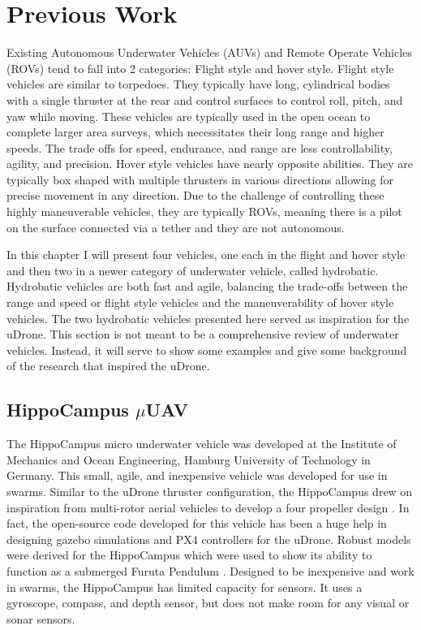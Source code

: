 \section{Previous Work}
Existing Autonomous Underwater Vehicles (AUVs) and Remote Operate Vehicles (ROVs) tend to fall into 2 categories: Flight style and hover style. Flight style vehicles are similar to torpedoes. They typically have long, cylindrical bodies with a single thruster at the rear and control surfaces to control roll, pitch, and yaw while moving. These vehicles are typically used in the open ocean to complete larger area surveys, which necessitates their long range and higher speeds. The trade offs for speed, endurance, and range are less controllability, agility, and precision. Hover style vehicles have nearly opposite abilities. They are typically box shaped with multiple thrusters in various directions allowing for precise movement in any direction. Due to the challenge of controlling these highly maneuverable vehicles, they are typically ROVs, meaning there is a pilot on the surface connected via a tether and they are not autonomous. 

In this chapter I will present four vehicles, one each in the flight and hover style and then two in a newer category of underwater vehicle, called hydrobatic. Hydrobatic vehicles are both fast and agile, balancing the trade-offs between the range and speed or flight style vehicles and the maneuverability of hover style vehicles. The two hydrobatic vehicles presented here served as inspiration for the uDrone. This section is not meant to be a comprehensive review of underwater vehicles. Instead, it will serve to show some examples and give some background of the research that inspired the uDrone. 

\subsection{HippoCampus $\mu$UAV}
The HippoCampus micro underwater vehicle was developed at the Institute of Mechanics and Ocean Engineering, Hamburg University of Technology in Germany. This small, agile, and inexpensive vehicle was developed for use in swarms. Similar to the uDrone thruster configuration, the HippoCampus drew on inspiration from multi-rotor aerial vehicles to develop a four propeller design \parencite{hipp1}. In fact, the open-source code developed for this vehicle has been a huge help in designing gazebo simulations and PX4 controllers for the uDrone. Robust models were derived for the HippoCampus which were used to show its ability to function as a submerged Furuta Pendulum \parencite{hipp_pen}. Designed to be inexpensive and work in swarms, the HippoCampus has limited capacity for sensors. It uses a gyroscope, compass, and depth sensor, but does not make room for any visual or sonar sensors.

